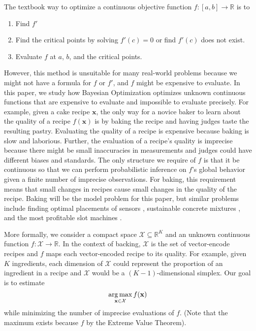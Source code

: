 The textbook way to optimize a continuous objective function $f: [a, b] \to \mathbb{R}$ is to
\begin{enumerate}
    \item Find $f'$
    \item Find the critical points by solving $f'(c) = 0$ or find $f'(c)$ does not exist.
    \item Evaluate $f$ at $a$, $b$, and the critical points.
\end{enumerate}
However, this method is unsuitable for many real-world problems because
we might not have a formula for $f$ or $f'$, and $f$ might be expensive to evaluate.
In this paper, we study how Bayesian Optimization optimizes unknown continuous functions that are expensive to evaluate and impossible to evaluate precisely.
For example, given a cake recipe $\mathbf{x}$, the only way for a novice baker to learn about
the quality of a recipe $f(\mathbf{x})$ is by baking the recipe and having judges taste the resulting pastry.
Evaluating the quality of a recipe is expensive because baking is slow and laborious.
Further, the evaluation of a recipe's quality is imprecise because there might be small inaccuracies in measurements
and judges could have different biases and standards.
The only structure we require of $f$ is that it be continuous so that we can perform probabilistic inference on $f$'s global behavior given 
a finite number of imprecise observations.
For baking, this requirement means that small changes in recipes cause small changes in the quality of the recipe.
Baking will be the model problem for this paper, but similar problems
include finding optimal placements of sensors \cite{capl2017}, sustainable concrete mixtures \cite{ament2023},
and the most profitable slot machines \cite{shahriari2016}.

More formally, we consider a compact space $\mathcal{X} \subseteq \mathbb{R}^{K}$  and an unknown continuous function $f: \mathcal{X} \to \mathbb{R}$.
In the context of backing, $\mathcal{X}$ is the set of vector-encode recipes
and $f$ maps each vector-encoded recipe to its quality.
For example, given $K$ ingredients, each dimension of $\mathcal{X}$ could represent the proportion of an ingredient in a recipe
and $\mathcal{X}$ would be a $(K - 1)$-dimensional simplex.
Our goal is to estimate
\begin{equation}\label{eq:obj}
    \operatorname*{arg\,max}_{\mathbf{x} \in \mathcal{X}} f(\mathbf{x})
\end{equation}
while minimizing the number of imprecise evaluations of $f$.
(Note that the maximum exists because $f$ by the Extreme Value Theorem).

